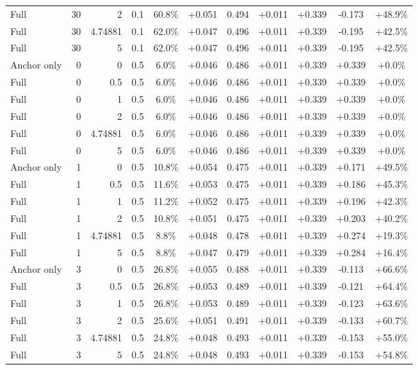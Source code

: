 \begin{table}[htbp]
\begin{tabular}{lrrrccccccc}
Full & 30 & 2 & 0.1 & 60.8\% & +0.051 & 0.494 & +0.011 & +0.339 & -0.173 & +48.9\% \\
Full & 30 & 4.74881 & 0.1 & 62.0\% & +0.047 & 0.496 & +0.011 & +0.339 & -0.195 & +42.5\% \\
Full & 30 & 5 & 0.1 & 62.0\% & +0.047 & 0.496 & +0.011 & +0.339 & -0.195 & +42.5\% \\
Anchor only & 0 & 0 & 0.5 & 6.0\% & +0.046 & 0.486 & +0.011 & +0.339 & +0.339 & +0.0\% \\
Full & 0 & 0.5 & 0.5 & 6.0\% & +0.046 & 0.486 & +0.011 & +0.339 & +0.339 & +0.0\% \\
Full & 0 & 1 & 0.5 & 6.0\% & +0.046 & 0.486 & +0.011 & +0.339 & +0.339 & +0.0\% \\
Full & 0 & 2 & 0.5 & 6.0\% & +0.046 & 0.486 & +0.011 & +0.339 & +0.339 & +0.0\% \\
Full & 0 & 4.74881 & 0.5 & 6.0\% & +0.046 & 0.486 & +0.011 & +0.339 & +0.339 & +0.0\% \\
Full & 0 & 5 & 0.5 & 6.0\% & +0.046 & 0.486 & +0.011 & +0.339 & +0.339 & +0.0\% \\
Anchor only & 1 & 0 & 0.5 & 10.8\% & +0.054 & 0.475 & +0.011 & +0.339 & +0.171 & +49.5\% \\
Full & 1 & 0.5 & 0.5 & 11.6\% & +0.053 & 0.475 & +0.011 & +0.339 & +0.186 & +45.3\% \\
Full & 1 & 1 & 0.5 & 11.2\% & +0.052 & 0.475 & +0.011 & +0.339 & +0.196 & +42.3\% \\
Full & 1 & 2 & 0.5 & 10.8\% & +0.051 & 0.475 & +0.011 & +0.339 & +0.203 & +40.2\% \\
Full & 1 & 4.74881 & 0.5 & 8.8\% & +0.048 & 0.478 & +0.011 & +0.339 & +0.274 & +19.3\% \\
Full & 1 & 5 & 0.5 & 8.8\% & +0.047 & 0.479 & +0.011 & +0.339 & +0.284 & +16.4\% \\
Anchor only & 3 & 0 & 0.5 & 26.8\% & +0.055 & 0.488 & +0.011 & +0.339 & -0.113 & +66.6\% \\
Full & 3 & 0.5 & 0.5 & 26.8\% & +0.053 & 0.489 & +0.011 & +0.339 & -0.121 & +64.4\% \\
Full & 3 & 1 & 0.5 & 26.8\% & +0.053 & 0.489 & +0.011 & +0.339 & -0.123 & +63.6\% \\
Full & 3 & 2 & 0.5 & 25.6\% & +0.051 & 0.491 & +0.011 & +0.339 & -0.133 & +60.7\% \\
Full & 3 & 4.74881 & 0.5 & 24.8\% & +0.048 & 0.493 & +0.011 & +0.339 & -0.153 & +55.0\% \\
Full & 3 & 5 & 0.5 & 24.8\% & +0.048 & 0.493 & +0.011 & +0.339 & -0.153 & +54.8\% \\

\end{tabular}
\end{table}
